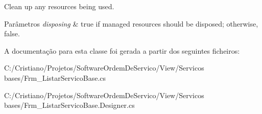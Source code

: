 Clean up any resources being used. 


\begin{DoxyParams}{Parâmetros}
{\em disposing} & true if managed resources should be disposed; otherwise, false.\\
\hline
\end{DoxyParams}


A documentação para esta classe foi gerada a partir dos seguintes ficheiros\+:\begin{DoxyCompactItemize}
\item 
C\+:/\+Cristiano/\+Projetos/\+Software\+Ordem\+De\+Servico/\+View/\+Servicos bases/Frm\+\_\+\+Listar\+Servico\+Base.\+cs\item 
C\+:/\+Cristiano/\+Projetos/\+Software\+Ordem\+De\+Servico/\+View/\+Servicos bases/Frm\+\_\+\+Listar\+Servico\+Base.\+Designer.\+cs\end{DoxyCompactItemize}
